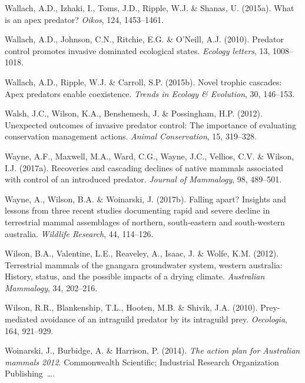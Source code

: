 \documentclass[11pt,a4paper,titlepage,twoside,openright]{style/unimelbthesis}
\begin{document}
\begin{mainmatter}
\leavevmode\hypertarget{ref-wallach2015apex}{}%
Wallach, A.D., Izhaki, I., Toms, J.D., Ripple, W.J. \& Shanas, U. (2015a). What is an apex predator? \emph{Oikos}, 124, 1453--1461.

\leavevmode\hypertarget{ref-wallach2010predator}{}%
Wallach, A.D., Johnson, C.N., Ritchie, E.G. \& O'Neill, A.J. (2010). Predator control promotes invasive dominated ecological states. \emph{Ecology letters}, 13, 1008--1018.

\leavevmode\hypertarget{ref-wallach2015novel}{}%
Wallach, A.D., Ripple, W.J. \& Carroll, S.P. (2015b). Novel trophic cascades: Apex predators enable coexistence. \emph{Trends in Ecology \& Evolution}, 30, 146--153.

\leavevmode\hypertarget{ref-walsh2012unexpected}{}%
Walsh, J.C., Wilson, K.A., Benshemesh, J. \& Possingham, H.P. (2012). Unexpected outcomes of invasive predator control: The importance of evaluating conservation management actions. \emph{Animal Conservation}, 15, 319--328.

\leavevmode\hypertarget{ref-wayne2017recoveries}{}%
Wayne, A.F., Maxwell, M.A., Ward, C.G., Wayne, J.C., Vellios, C.V. \& Wilson, I.J. (2017a). Recoveries and cascading declines of native mammals associated with control of an introduced predator. \emph{Journal of Mammalogy}, 98, 489--501.

\leavevmode\hypertarget{ref-wayne2017falling}{}%
Wayne, A., Wilson, B.A. \& Woinarski, J. (2017b). Falling apart? Insights and lessons from three recent studies documenting rapid and severe decline in terrestrial mammal assemblages of northern, south-eastern and south-western australia. \emph{Wildlife Research}, 44, 114--126.

\leavevmode\hypertarget{ref-wilson2012terrestrial}{}%
Wilson, B.A., Valentine, L.E., Reaveley, A., Isaac, J. \& Wolfe, K.M. (2012). Terrestrial mammals of the gnangara groundwater system, western australia: History, status, and the possible impacts of a drying climate. \emph{Australian Mammalogy}, 34, 202--216.

\leavevmode\hypertarget{ref-wilson2010prey}{}%
Wilson, R.R., Blankenship, T.L., Hooten, M.B. \& Shivik, J.A. (2010). Prey-mediated avoidance of an intraguild predator by its intraguild prey. \emph{Oecologia}, 164, 921--929.

\leavevmode\hypertarget{ref-woinarski2014action}{}%
Woinarski, J., Burbidge, A. \& Harrison, P. (2014). \emph{The action plan for Australian mammals 2012}. Commonwealth Scientific; Industrial Research Organization Publishing~\ldots.


\end{mainmatter}
\end{document}
